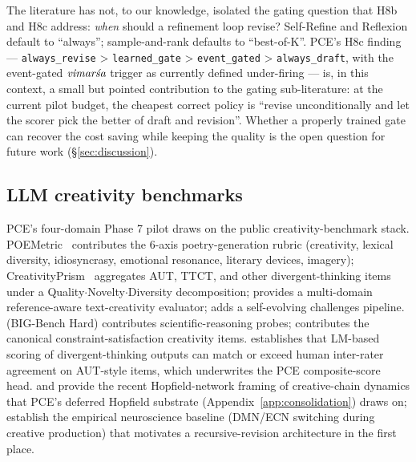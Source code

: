 The literature has not, to our knowledge, isolated the gating question that H8b and H8c address: \emph{when} should a refinement loop revise? Self-Refine and Reflexion default to ``always''; sample-and-rank defaults to ``best-of-K''. PCE's H8c finding --- \texttt{always\_revise} > \texttt{learned\_gate} > \texttt{event\_gated} > \texttt{always\_draft}, with the event-gated $\textit{vimar\'sa}$ trigger as currently defined under-firing --- is, in this context, a small but pointed contribution to the gating sub-literature: at the current pilot budget, the cheapest correct policy is ``revise unconditionally and let the scorer pick the better of draft and revision''. Whether a properly trained  gate can recover the cost saving while keeping the quality is the open question for future work (\S\ref{sec:discussion}).

\subsection{LLM creativity benchmarks}

PCE's four-domain Phase 7 pilot draws on the public creativity-benchmark stack. POEMetric~\citep{Ye2025POEMetric,li2026poemetric} contributes the 6-axis poetry-generation rubric (creativity, lexical diversity, idiosyncrasy, emotional resonance, literary devices, imagery); CreativityPrism~\citep{CreativityPrism2025,hou2025creativityprism} aggregates AUT, TTCT, and other divergent-thinking items under a Quality$\cdot$Novelty$\cdot$Diversity decomposition; \citet{cao2025creval} provides a multi-domain reference-aware text-creativity evaluator; \citet{wang2026creativebench} adds a self-evolving challenges pipeline. \citet{suzgun2023bbh} (BIG-Bench Hard) contributes scientific-reasoning probes; \citet{Tian2024MacGyver} contributes the canonical constraint-satisfaction creativity items. \citet{organisciak2023aut} establishes that LM-based scoring of divergent-thinking outputs can match or exceed human inter-rater agreement on AUT-style items, which underwrites the PCE composite-score head. \citet{Mtenga2024HopfieldCreativity} and \citet{Weber2025SelfOptHopfield} provide the recent Hopfield-network framing of creative-chain dynamics that PCE's deferred Hopfield  substrate (Appendix~\ref{app:consolidation}) draws on; \citet{Beaty2015SciRepDMNECN,ChenKenett2025CommunBiolDynamics} establish the empirical neuroscience baseline (DMN/ECN switching during creative production) that motivates a recursive-revision architecture in the first place.

